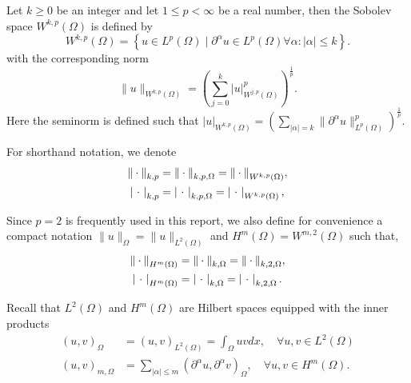   Let $k\ge 0$ be an integer and let $1 \le  p <  \infty$ be a real number, then the Sobolev space $W^{k,p}( \Omega ) $ is defined by
  \begin{equation}
W^{k,p}\left( \Omega  \right) = \left\{ u \in L^{p}\left( \Omega  \right)  \mid  \partial ^{\alpha } u \in L^{p}\left( \Omega  \right)  \forall \alpha : \left\lvert \alpha  \right\rvert  \le k \right\}.
  \end{equation}
with the corresponding norm
\begin{equation}
\| u \|_{ W^{k,p}\left( \Omega  \right)  }^{  }  = \left(   \sum_{j = 0}^{k}  \left\lvert u \right\rvert ^{p} _{  W^{j,p}\left( \Omega  \right) } \right)^{\frac{1}{p}} .
\end{equation}
Here the seminorm is defined such that $ \left\lvert u \right\rvert _{W^{k,p}( \Omega  ) }^{} =  ( \sum_{\left\lvert \alpha  \right\rvert  = k}^{} \| \partial ^{\alpha }u \|_{ L^{p}( \Omega )   }^{ p } )^{\frac{1}{p}} $.

For shorthand notation, we denote
\begin{equation}
    \begin{split}
\| \cdot \|_{k,p}^{  } & = \| \cdot  \|_{k,p,\Omega   }^{  } = \| \cdot  \|_{ W^{k,p}( \Omega )   }^{  }, \\
   \abs{ \  \cdot \ }_{k,p}^{  } &= \abs{ \   \cdot \ }_{k,p,\Omega   }^{  } = \abs{ \  \cdot \ }_{ W^{k,p}( \Omega )   }^{  },
    \end{split}
\end{equation}

Since $p=2$ is frequently used in this report, we also define for convenience a compact notation $\| u \|_{ \Omega  }^{  }  = \| u \|_{ L^{2}\left( \Omega  \right)  }^{  } $ and $H^{m}( \Omega ) = W^{m,2}( \Omega )  $ such that,
\begin{equation}
\begin{split}
\| \cdot  \|_{H^{m}( \Omega )   }^{  } & = \|   \cdot  \|_{k,\Omega   }^{  } = \|   \cdot  \|_{k,2,\Omega   }^{  },  \\
\left\lvert  \   \cdot \   \right\rvert_{H^{m}( \Omega )   }^{  } & = \left\lvert  \   \cdot \   \right\rvert _{k,\Omega   }^{  } =  \left\lvert  \ \cdot \    \right\rvert _{k,2,\Omega   }^{  }.
\end{split}
\end{equation}

Recall that $L^{2}( \Omega ) $ and $H^{m}( \Omega ) $ are Hilbert spaces equipped with the inner products
\begin{equation}
    \begin{split}
\left( u,v \right) _{\Omega } & = \left( u,v \right) _{L^2\left( \Omega  \right) } = \int_{\Omega }^{} u  v dx, \quad \forall u,v \in L^{2}( \Omega )  \\
    \left( u,v \right) _{m,\Omega } & = \sum_{\left\lvert \alpha  \right\rvert  \le  m}^{}  ( \partial ^{\alpha } u ,  \partial ^{\alpha } v )_{\Omega }, \quad  \forall u,v \in H^{m}( \Omega  ).
    \end{split}
\end{equation}

